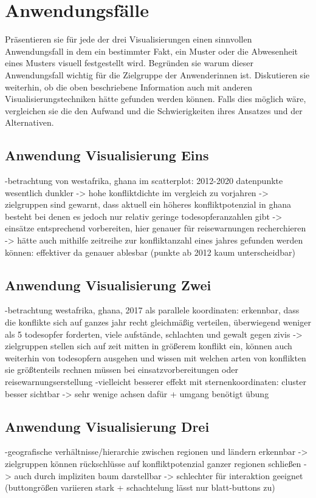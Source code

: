 \documentclass[usegeometry=true]{scrartcl}
\begin{document}
\section{Anwendungsfälle}
Präsentieren sie für jede der drei Visualisierungen einen sinnvollen Anwendungsfall in dem ein bestimmter Fakt, ein Muster oder die Abwesenheit eines Musters visuell festgestellt wird. Begründen sie warum dieser Anwendungsfall wichtig für die Zielgruppe der Anwenderinnen ist. Diskutieren sie weiterhin, ob die oben beschriebene Information auch mit anderen Visualisierungstechniken hätte gefunden werden können. Falls dies möglich wäre, vergleichen sie die den Aufwand und die Schwierigkeiten ihres Ansatzes und der Alternativen. 

\subsection{Anwendung Visualisierung Eins}
-betrachtung von westafrika, ghana im scatterplot: 2012-2020 datenpunkte wesentlich dunkler -> hohe konfliktdichte im vergleich zu vorjahren -> zielgruppen sind gewarnt, dass aktuell ein höheres konfliktpotenzial in ghana besteht bei denen es jedoch nur relativ geringe todesopferanzahlen gibt -> einsätze entsprechend vorbereiten, hier genauer für reisewarnungen recherchieren -> hätte auch mithilfe zeitreihe zur konfliktanzahl eines jahres gefunden werden können: effektiver da genauer ablesbar (punkte ab 2012 kaum unterscheidbar)

\subsection{Anwendung Visualisierung Zwei}
-betrachtung westafrika, ghana, 2017 als parallele koordinaten: erkennbar, dass die konflikte sich auf ganzes jahr recht gleichmäßig verteilen, überwiegend weniger als 5 todesopfer forderten, viele aufstände, schlachten und gewalt gegen zivis -> zielgruppen stellen sich auf zeit mitten in größerem konflikt ein, können auch weiterhin von todesopfern ausgehen und wissen mit welchen arten von konflikten sie größtenteils rechnen müssen bei einsatzvorbereitungen oder reisewarnungserstellung
-vielleicht besserer effekt mit sternenkoordinaten: cluster besser sichtbar -> sehr wenige achsen dafür + umgang benötigt übung

\subsection{Anwendung Visualisierung Drei}
-geografische verhältnisse/hierarchie zwischen regionen und ländern erkennbar -> zielgruppen können rückschlüsse auf konfliktpotenzial ganzer regionen schließen -> auch durch impliziten baum darstellbar -> schlechter für interaktion geeignet (buttongrößen variieren stark + schachtelung lässt nur blatt-buttons zu)
\end{document}
